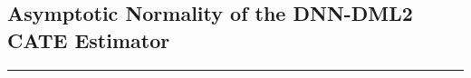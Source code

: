 
\newpage
\subsection{Asymptotic Normality of the DNN-DML2 CATE Estimator}\label{CATE_AsympNorm}
\hrule

